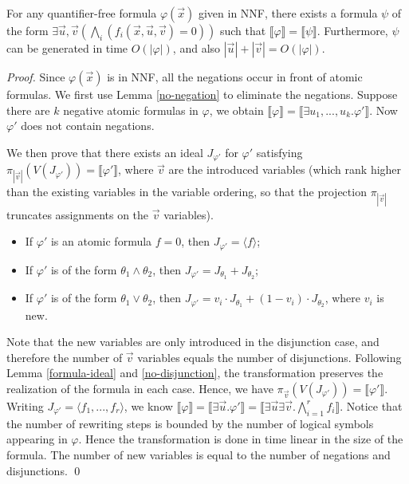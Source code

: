 \documentclass[envcountsect]{llncs}
\begin{document}
\begin{theorem}
For any quantifier-free formula $\varphi(\vec x)$ given in NNF, there exists a formula $\psi$ of the form $\exists \vec u, \vec v (\bigwedge_i( f_i(\vec x, \vec u, \vec v)=0))$ such that $\llbracket \varphi \rrbracket = \llbracket \psi \rrbracket$. Furthermore, $\psi$ can be generated in time $O(|\varphi|)$, and also $|\vec u|+|\vec v|=O(|\varphi|)$.
\label{flatten-theorem}
\end{theorem}
\begin{proof}
Since $\varphi(\vec x)$ is in NNF, all the negations occur in front of atomic formulas. We first use Lemma \ref{no-negation} to eliminate the negations. Suppose there are $k$ negative atomic formulas in $\varphi$, we obtain $\llbracket \varphi \rrbracket= \llbracket\exists u_1,...,u_k.\varphi'\rrbracket$. Now $\varphi'$ does not contain negations.

We then prove that there exists an ideal $J_{\varphi'}$ for $\varphi'$ satisfying $\pi_{|\vec v|}(V(J_{\varphi'}))=\llbracket \varphi'\rrbracket$, where $\vec v$ are the introduced variables (which rank higher than the existing variables in the variable ordering, so that the projection $\pi_{|\vec v|}$ truncates assignments on the $\vec v$ variables).
\begin{itemize}
\item If $\varphi'$ is an atomic formula $f=0$, then $J_{\varphi'}=\langle f\rangle$;

\item If $\varphi'$ is of the form $\theta_1\wedge \theta_2$, then $J_{\varphi'}= J_{\theta_1}+J_{\theta_2}$;

\item If $\varphi'$ is of the form $\theta_1\vee \theta_2$, then $J_{\varphi'}= v_i\cdot J_{\theta_1}+(1-v_i)\cdot J_{\theta_2}$, where $v_i$ is new.
\end{itemize}
Note that the new variables are only introduced in the disjunction case, and therefore the number of $\vec v$ variables equals the number of disjunctions. Following Lemma \ref{formula-ideal} and \ref{no-disjunction}, the transformation preserves the realization of the formula in each case. Hence, we have $\pi_{\vec v}(V(J_{\varphi'}))=\llbracket \varphi'\rrbracket$. Writing $J_{\varphi'}=\langle f_1,...,f_r\rangle$, we know $\llbracket\varphi\rrbracket = \llbracket\exists \vec u.\varphi'\rrbracket=\llbracket\exists \vec u\exists\vec v.\bigwedge_{i=1}^r f_i\rrbracket.$ Notice that the number of rewriting steps is bounded by the number of logical symbols appearing in $\varphi$. Hence the transformation is done in time linear in the size of the formula. The number of new variables is equal to the number of negations and disjunctions. 
\qed
\end{proof}
\end{document}
